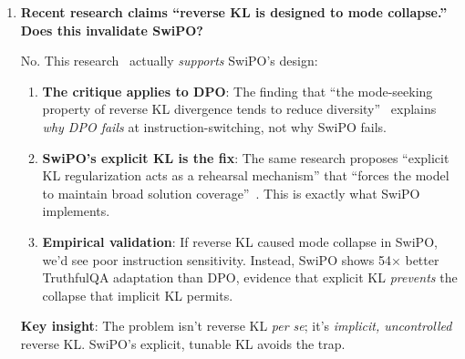 \begin{enumerate}[label=\textbf{Q\arabic*.}, leftmargin=*, itemsep=8pt]
\textbf{SwiPO's solution}: By separating $\lambda_{\text{KL}}$ from $\beta$, SwiPO can:
\begin{enumerate}[leftmargin=*,itemsep=1pt]
    \item Set $\beta$ high for sharp preference learning
    \item Set $\lambda_{\text{KL}}$ to maintain behavioral diversity
    \item Find the sweet spot that achieves \textit{both} goals
\end{enumerate}

This decoupling is why SwiPO achieves 86.7\% instruction-alignment efficiency while DPO achieves only 56.1\%, a 30.6 percentage point (pp) gap explained entirely by KL architecture.

\vspace{4mm}

\item \textbf{Recent research claims ``reverse KL is designed to mode collapse.'' Does this invalidate SwiPO?}

 No. This research~\cite{liu2024kl,goyal2024beyond} actually \textit{supports} SwiPO's design:

\begin{enumerate}[leftmargin=*,itemsep=2pt]
    \item \textbf{The critique applies to DPO}: The finding that ``the mode-seeking property of reverse KL divergence tends to reduce diversity''~\cite{goyal2024beyond} explains \textit{why DPO fails} at instruction-switching, not why SwiPO fails.

    \item \textbf{SwiPO's explicit KL is the fix}: The same research proposes ``explicit KL regularization acts as a rehearsal mechanism'' that ``forces the model to maintain broad solution coverage''~\cite{wang2024comprehensive}. This is exactly what SwiPO implements.

    \item \textbf{Empirical validation}: If reverse KL caused mode collapse in SwiPO, we'd see poor instruction sensitivity. Instead, SwiPO shows 54$\times$ better TruthfulQA adaptation than DPO, evidence that explicit KL \textit{prevents} the collapse that implicit KL permits.
\end{enumerate}

\textbf{Key insight}: The problem isn't reverse KL \textit{per se}; it's \textit{implicit, uncontrolled} reverse KL. SwiPO's explicit, tunable KL avoids the trap.



\end{enumerate}
